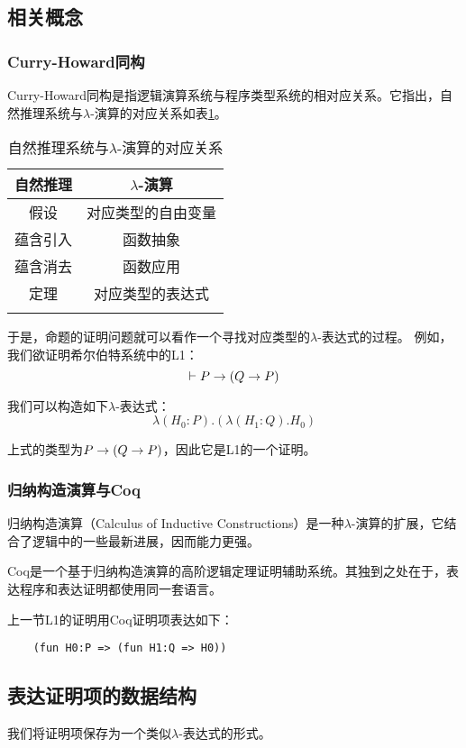 \subsection{相关概念}
\subsubsection{Curry-Howard同构}
Curry-Howard同构\cite{HowardWA:fortnc}是指逻辑演算系统与程序类型系统的相对应关系。它指出，自然推理系统与$\lambda$-演算的对应关系如表\ref{tab:curry}。
\begin{table}[!ht]
  \caption{自然推理系统与$\lambda$-演算的对应关系}
  \label{tab:curry}
  \centering
  \begin{tabular}{cc}
    \whline
    自然推理 & $\lambda$-演算 \\
    \hline
    假设 & 对应类型的自由变量 \\
    蕴含引入 & 函数抽象 \\
    蕴含消去 & 函数应用 \\
    定理 & 对应类型的表达式 \\
    \whline
  \end{tabular}
\end{table}

于是，命题的证明问题就可以看作一个寻找对应类型的$\lambda$-表达式的过程。
例如，我们欲证明希尔伯特系统中的L1：
$$ \vdash P \rightarrow (Q \rightarrow P) $$

我们可以构造如下$\lambda$-表达式：
$$\lambda (H_0: P).(\lambda (H_1: Q).H_0)$$

上式的类型为$P \rightarrow (Q \rightarrow P) $，因此它是L1的一个证明。

\subsubsection{归纳构造演算与Coq}
归纳构造演算（Calculus of Inductive Constructions）是一种$\lambda$-演算的扩展，它结合了逻辑中的一些最新进展，因而能力更强。

Coq\cite{coq}是一个基于归纳构造演算的高阶逻辑定理证明辅助系统。其独到之处在于，表达程序和表达证明都使用同一套语言。

上一节L1的证明用Coq证明项表达如下：
\begin{verbatim}
    (fun H0:P => (fun H1:Q => H0))
\end{verbatim}

\subsection{表达证明项的数据结构}
我们将证明项保存为一个类似$\lambda$-表达式的形式。

